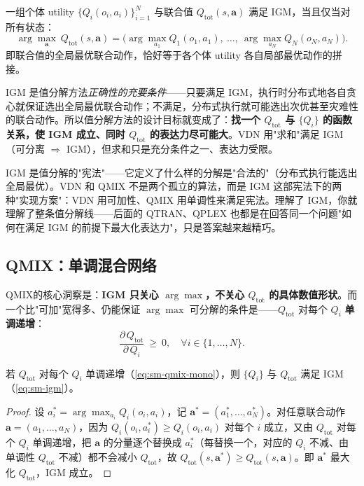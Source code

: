 \begin{definition}\label{def:sm-igm}
一组个体 utility $\{Q_i(o_i,a_i)\}_{i=1}^N$ 与联合值 $Q_{\text{tot}}(s,\mathbf{a})$ 满足 IGM，当且仅当对所有状态：
\begin{equation}
  \arg\max_{\mathbf{a}}\ Q_{\text{tot}}(s,\mathbf{a})=\Big(\arg\max_{a_1}Q_1(o_1,a_1),\ \dots,\ \arg\max_{a_N}Q_N(o_N,a_N)\Big).
  \label{eq:sm-igm}
\end{equation}
即联合值的全局最优联合动作，恰好等于各个体 utility 各自局部最优动作的拼接。
\end{definition}

IGM 是值分解方法\emph{正确性的充要条件}——只要满足 IGM，执行时分布式地各自贪心就保证选出全局最优联合动作；不满足，分布式执行就可能选出次优甚至灾难性的联合动作。所以值分解方法的设计目标就变成了：\textbf{找一个 $Q_{\text{tot}}$ 与 $\{Q_i\}$ 的函数关系，使 IGM 成立、同时 $Q_{\text{tot}}$ 的表达力尽可能大}。VDN 用"求和"满足 IGM（可分离 $\Rightarrow$ IGM），但求和只是充分条件之一、表达力受限。

\begin{insight}
IGM 是值分解的"宪法"——它定义了什么样的分解是"合法的"（分布式执行能选出全局最优）。VDN 和 QMIX 不是两个孤立的算法，而是 IGM 这部宪法下的两种"实现方案"：VDN 用可加性、QMIX 用单调性来满足宪法。理解了 IGM，你就理解了整条值分解线——后面的 QTRAN、QPLEX 也都是在回答同一个问题"如何在满足 IGM 的前提下最大化表达力"，只是答案越来越精巧。
\end{insight}

\subsection{QMIX：单调混合网络}

QMIX\cite{rashid2018qmix}的核心洞察是：\textbf{IGM 只关心 $\arg\max$，不关心 $Q_{\text{tot}}$ 的具体数值形状}。而一个比"可加"宽得多、仍能保证 $\arg\max$ 可分解的条件是——$Q_{\text{tot}}$ 对每个 $Q_i$ \textbf{单调递增}：
\begin{equation}
  \frac{\partial\,Q_{\text{tot}}}{\partial\,Q_i}\ \ge\ 0,\quad\forall i\in\{1,\dots,N\}.
  \label{eq:sm-qmix-mono}
\end{equation}

\begin{theorem}\label{thm:sm-mono-igm}
若 $Q_{\text{tot}}$ 对每个 $Q_i$ 单调递增（\cref{eq:sm-qmix-mono}），则 $\{Q_i\}$ 与 $Q_{\text{tot}}$ 满足 IGM（\cref{eq:sm-igm}）。
\end{theorem}
\begin{proof}
设 $a_i^*=\arg\max_{a_i}Q_i(o_i,a_i)$，记 $\mathbf{a}^*=(a_1^*,\dots,a_N^*)$。对任意联合动作 $\mathbf{a}=(a_1,\dots,a_N)$，因为 $Q_i(o_i,a_i^*)\ge Q_i(o_i,a_i)$ 对每个 $i$ 成立，又由 $Q_{\text{tot}}$ 对每个 $Q_i$ 单调递增，把 $\mathbf{a}$ 的分量逐个替换成 $a_i^*$（每替换一个，对应的 $Q_i$ 不减、由单调性 $Q_{\text{tot}}$ 不减）都不会减小 $Q_{\text{tot}}$，故 $Q_{\text{tot}}(s,\mathbf{a}^*)\ge Q_{\text{tot}}(s,\mathbf{a})$。即 $\mathbf{a}^*$ 最大化 $Q_{\text{tot}}$，IGM 成立。
\end{proof}


